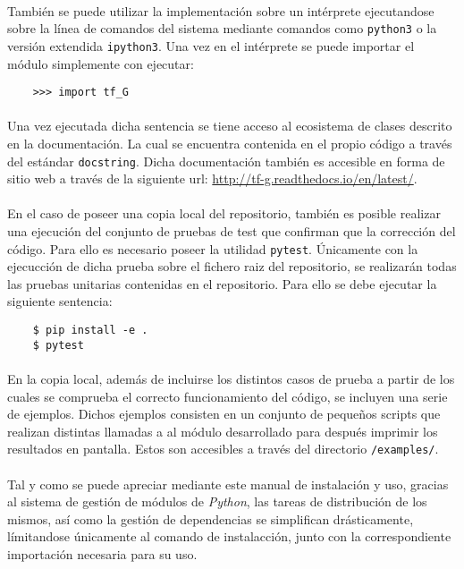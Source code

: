 \documentclass{subfiles}
\begin{document}
    \paragraph{}
    También se puede utilizar la implementación sobre un intérprete ejecutandose sobre la línea de comandos del sistema mediante comandos como \texttt{python3} o la versión extendida \texttt{ipython3}. Una vez en el intérprete se puede importar el módulo simplemente con ejecutar:

    \begin{verbatim}
    >>> import tf_G
    \end{verbatim}

    \paragraph{}
    Una vez ejecutada dicha sentencia se tiene acceso al ecosistema de clases descrito en la documentación. La cual se encuentra contenida en el propio código a través del estándar \texttt{docstring}. Dicha documentación también es accesible en forma de sitio web a través de la siguiente url: \url{http://tf-g.readthedocs.io/en/latest/}.

    \paragraph{}
    En el caso de poseer una copia local del repositorio, también es posible realizar una ejecución del conjunto de pruebas de test que confirman que la corrección del código. Para ello es necesario poseer la utilidad \texttt{pytest}. Únicamente con la ejecucción de dicha prueba sobre el fichero raiz del repositorio, se realizarán todas las pruebas unitarias contenidas en el repositorio. Para ello se debe ejecutar la siguiente sentencia:

    \begin{verbatim}
    $ pip install -e .
    $ pytest
    \end{verbatim}

    \paragraph{}
    En la copia local, además de incluirse los distintos casos de prueba a partir de los cuales se comprueba el correcto funcionamiento del código, se incluyen una serie de ejemplos. Dichos ejemplos consisten en un conjunto de pequeños scripts que realizan distintas llamadas a al módulo desarrollado para después imprimir los resultados en pantalla. Estos son accesibles a través del directorio \texttt{/examples/}.

    \paragraph{}
    Tal y como se puede apreciar mediante este manual de instalación y uso, gracias al sistema de gestión de módulos de \emph{Python}, las tareas de distribución de los mismos, así como la gestión de dependencias se simplifican drásticamente, límitandose únicamente al comando de instalacción, junto con la correspondiente importación necesaria para su uso.
\end{document}

